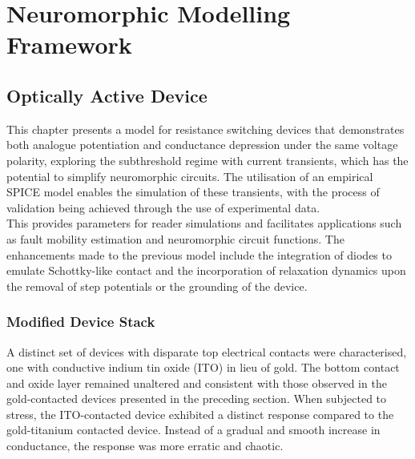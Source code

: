 \chapter{Neuromorphic Modelling Framework}

\section[Optically Active Device]{Optically Active Device}

This chapter presents a model for resistance switching devices that demonstrates both analogue potentiation and conductance depression under the same voltage polarity, exploring the subthreshold regime with current transients, which has the potential to simplify neuromorphic circuits. The utilisation of an empirical SPICE model enables the simulation of these transients, with the process of validation being achieved through the use of experimental data. \\

\noindent This provides parameters for reader simulations and facilitates applications such as fault mobility estimation and neuromorphic circuit functions. The enhancements made to the previous model include the integration of diodes to emulate Schottky-like contact and the incorporation of relaxation dynamics upon the removal of step potentials or the grounding of the device.

\subsection[Modified Device Stack]{Modified Device Stack}

A distinct set of devices with disparate top electrical contacts were characterised, one with conductive indium tin oxide (ITO) in lieu of gold. The bottom contact and oxide layer remained unaltered and consistent with those observed in the gold-contacted devices presented in the preceding section. When subjected to stress, the ITO-contacted device exhibited a distinct response compared to the gold-titanium contacted device. Instead of a gradual and smooth increase in conductance, the response was more erratic and chaotic. \\

